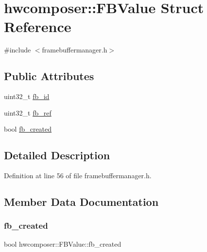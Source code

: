 \hypertarget{structhwcomposer_1_1FBValue}{}\section{hwcomposer\+:\+:F\+B\+Value Struct Reference}
\label{structhwcomposer_1_1FBValue}


{\ttfamily \#include $<$framebuffermanager.\+h$>$}

\subsection*{Public Attributes}
\begin{DoxyCompactItemize}
\item 
uint32\+\_\+t \mbox{\hyperlink{structhwcomposer_1_1FBValue_ae0c9875a23f139b972e17f626a36eb8b}{fb\+\_\+id}}
\item 
uint32\+\_\+t \mbox{\hyperlink{structhwcomposer_1_1FBValue_af5f43ee16be807bb84de9396c210d338}{fb\+\_\+ref}}
\item 
bool \mbox{\hyperlink{structhwcomposer_1_1FBValue_aac7b4736239c68709726d87a88f0ef38}{fb\+\_\+created}}
\end{DoxyCompactItemize}


\subsection{Detailed Description}


Definition at line 56 of file framebuffermanager.\+h.



\subsection{Member Data Documentation}
\mbox{\label{structhwcomposer_1_1FBValue_aac7b4736239c68709726d87a88f0ef38}} 
\subsubsection{\texorpdfstring{fb\+\_\+created}{fb\_created}}
{\footnotesize\ttfamily bool hwcomposer\+::\+F\+B\+Value\+::fb\+\_\+created}




